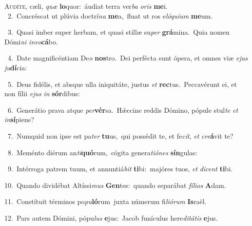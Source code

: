 \lettrine{\initial\textcolor{\initialcolor}{A}}{udíte,} cæli, \textit{quæ} \textbf{lo}\-quor:~\star áudiat terra ver\textit{ba} \textit{o}\-\textit{ris} \textbf{me}\-i.\\
{\numbfont\textcolor{\numbcolor}{~2.}}~Concréscat ut plúvia doctrí\textit{na} \textbf{me}\-a,~\star fluat ut ros e\-\textit{ló}\-\textit{qui}\textit{um} \textbf{me}\-um.\par
{\numbfont\textcolor{\numbcolor}{~3.}}~Quasi imber super herbam, et quasi stillæ su\textit{per} \textbf{grá}\-mina.~\star Quia nomen Dómi\textit{ni} \textit{in}\-\textit{vo}\textbf{cá}bo.\par
{\numbfont\textcolor{\numbcolor}{~4.}}~Date magnificéntiam De\textit{o} \textbf{nos}\-tro.~\star Dei perfécta sunt ópera, et omnes viæ \textit{e}\-\textit{jus} \textit{ju}\-\textbf{dí}cia:\par
{\numbfont\textcolor{\numbcolor}{~5.}}~Deus fidélis, et absque ulla iniquitáte, justus \textit{et} \textbf{rec}\-tus.~\star Peccavérunt ei, et non fílii \textit{e}\-\textit{jus} \textit{in} \textbf{sór}\-dibus:\par
{\numbfont\textcolor{\numbcolor}{~6.}}~Generátio prava atque \textit{per}\-\textbf{vér}sa.~\star Hǽccine reddis Dómino, pópule stul\textit{te} \textit{et} \textit{in}\-\textbf{sí}piens?\par
{\numbfont\textcolor{\numbcolor}{~7.}}~Numquid non ipse est pa\textit{ter} \textbf{tu}\-us,~\star qui possédit te, et fe\-\textit{cit}\-, \textit{et} \textit{cre}\-\textbf{á}vit te?\par
{\numbfont\textcolor{\numbcolor}{~8.}}~Meménto diérum an\-\textit{ti}\-\textbf{quó}rum,~\star cógita genera\-\textit{ti}\-\textit{ó}\textit{nes} \textbf{sín}\-gulas:\par
{\numbfont\textcolor{\numbcolor}{~9.}}~Intérroga patrem tuum, et annuntiá\textit{bit} \textbf{ti}\-bi:~\star majóres tuos, \textit{et} \textit{di}\-\textit{cent} \textbf{ti}\-bi.\par
{\numbfont\textcolor{\numbcolor}{10.}}~Quando dividébat Altíssi\textit{mus} \textbf{Gen}\-tes:~\star quando separábat \textit{fí}\-\textit{li}\textit{os} \textbf{A}\-dam.\par
{\numbfont\textcolor{\numbcolor}{11.}}~Constítuit términos po\-\textit{pu}\-\textbf{ló}rum~\star juxta númerum fi\-\textit{li}\-\textit{ó}\textit{rum} \textbf{Is}\-raël.\par
{\numbfont\textcolor{\numbcolor}{12.}}~Pars autem Dómini, pópu\textit{lus} \textbf{e}\-jus:~\star Jacob funículus here\-\textit{di}\-\textit{tá}\textit{tis} \textbf{e}\-jus.\par
